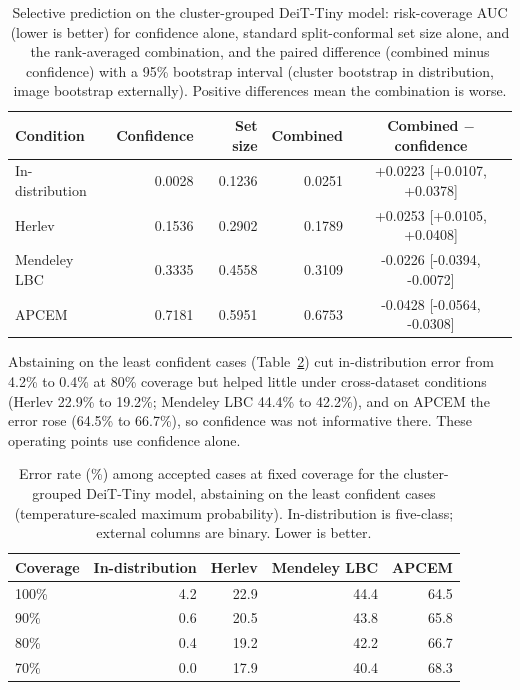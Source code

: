 \documentclass[12pt,letterpaper]{article}
\begin{document}
\begin{table}[htbp]
\centering
\caption{Selective prediction on the cluster-grouped DeiT-Tiny model: risk-coverage AUC (lower is better) for confidence alone, standard split-conformal set size alone, and the rank-averaged combination, and the paired difference (combined minus confidence) with a 95\% bootstrap interval (cluster bootstrap in distribution, image bootstrap externally). Positive differences mean the combination is worse.}
\label{tab:selective}
\small
\begin{tabular}{lrrrc}
\toprule
Condition & Confidence & Set size & Combined & Combined $-$ confidence \\
\midrule
In-distribution & 0.0028 & 0.1236 & 0.0251 & +0.0223 [+0.0107, +0.0378] \\
Herlev & 0.1536 & 0.2902 & 0.1789 & +0.0253 [+0.0105, +0.0408] \\
Mendeley LBC & 0.3335 & 0.4558 & 0.3109 & -0.0226 [-0.0394, -0.0072] \\
APCEM & 0.7181 & 0.5951 & 0.6753 & -0.0428 [-0.0564, -0.0308] \\
\bottomrule
\end{tabular}
\end{table}

Abstaining on the least confident cases (Table~\ref{tab:operating}) cut in-distribution error from 4.2\% to 0.4\% at 80\% coverage but helped little under cross-dataset conditions (Herlev 22.9\% to 19.2\%; Mendeley LBC 44.4\% to 42.2\%), and on APCEM the error rose (64.5\% to 66.7\%), so confidence was not informative there. These operating points use confidence alone.

\begin{table}[htbp]
\centering
\caption{Error rate (\%) among accepted cases at fixed coverage for the cluster-grouped DeiT-Tiny model, abstaining on the least confident cases (temperature-scaled maximum probability). In-distribution is five-class; external columns are binary. Lower is better.}
\label{tab:operating}
\small
\begin{tabular}{lrrrr}
\toprule
Coverage & In-distribution & Herlev & Mendeley LBC & APCEM \\
\midrule
100\% & 4.2 & 22.9 & 44.4 & 64.5 \\
90\% & 0.6 & 20.5 & 43.8 & 65.8 \\
80\% & 0.4 & 19.2 & 42.2 & 66.7 \\
70\% & 0.0 & 17.9 & 40.4 & 68.3 \\
\bottomrule
\end{tabular}
\end{table}
\end{document}
